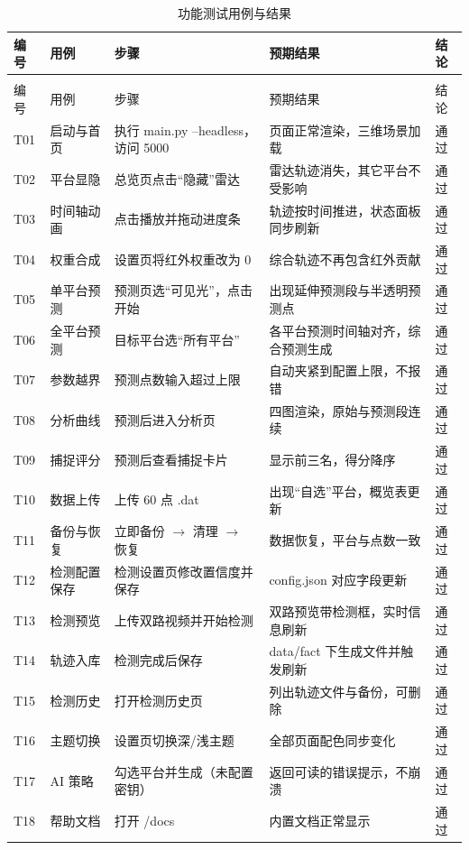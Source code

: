 \begin{longtable}{@{}>{\heiti\scriptsize}p{0.7cm}>{\scriptsize}p{3.1cm}>{\scriptsize}p{3.4cm}>{\raggedright\arraybackslash}p{5.6cm}>{\heiti\scriptsize}p{0.9cm}@{}}
\caption{功能测试用例与结果}\label{tab:testcases}\\
\toprule
编号 & 用例 & 步骤 & 预期结果 & 结论 \\
\midrule
\endfirsthead
\multicolumn{5}{@{}l}{\small 续表~\thetable}\\
\toprule
编号 & 用例 & 步骤 & 预期结果 & 结论 \\
\midrule
\endhead
\bottomrule
\endlastfoot
T01 & 启动与首页 & 执行 main.py --headless，访问 5000 & 页面正常渲染，三维场景加载 & 通过 \\
T02 & 平台显隐 & 总览页点击“隐藏”雷达 & 雷达轨迹消失，其它平台不受影响 & 通过 \\
T03 & 时间轴动画 & 点击播放并拖动进度条 & 轨迹按时间推进，状态面板同步刷新 & 通过 \\
T04 & 权重合成 & 设置页将红外权重改为 0 & 综合轨迹不再包含红外贡献 & 通过 \\
T05 & 单平台预测 & 预测页选“可见光”，点击开始 & 出现延伸预测段与半透明预测点 & 通过 \\
T06 & 全平台预测 & 目标平台选“所有平台” & 各平台预测时间轴对齐，综合预测生成 & 通过 \\
T07 & 参数越界 & 预测点数输入超过上限 & 自动夹紧到配置上限，不报错 & 通过 \\
T08 & 分析曲线 & 预测后进入分析页 & 四图渲染，原始与预测段连续 & 通过 \\
T09 & 捕捉评分 & 预测后查看捕捉卡片 & 显示前三名，得分降序 & 通过 \\
T10 & 数据上传 & 上传 60 点 .dat & 出现“自选”平台，概览表更新 & 通过 \\
T11 & 备份与恢复 & 立即备份 $\rightarrow$ 清理 $\rightarrow$ 恢复 & 数据恢复，平台与点数一致 & 通过 \\
T12 & 检测配置保存 & 检测设置页修改置信度并保存 & config.json 对应字段更新 & 通过 \\
T13 & 检测预览 & 上传双路视频并开始检测 & 双路预览带检测框，实时信息刷新 & 通过 \\
T14 & 轨迹入库 & 检测完成后保存 & data/fact 下生成文件并触发刷新 & 通过 \\
T15 & 检测历史 & 打开检测历史页 & 列出轨迹文件与备份，可删除 & 通过 \\
T16 & 主题切换 & 设置页切换深/浅主题 & 全部页面配色同步变化 & 通过 \\
T17 & AI 策略 & 勾选平台并生成（未配置密钥） & 返回可读的错误提示，不崩溃 & 通过 \\
T18 & 帮助文档 & 打开 /docs & 内置文档正常显示 & 通过 \\
\end{longtable}

